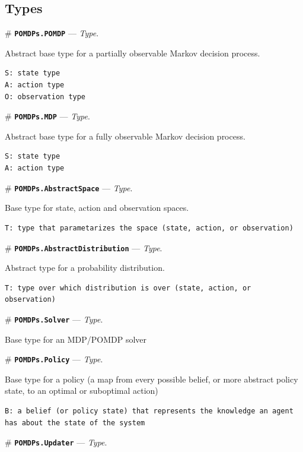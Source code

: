\documentclass[12pt,]{article}
\begin{document}
\subsection{Types}\label{types}

\# \textbf{\texttt{POMDPs.POMDP}} --- \emph{Type}.

Abstract base type for a partially observable Markov decision process.

\begin{verbatim}
S: state type
A: action type
O: observation type
\end{verbatim}

\# \textbf{\texttt{POMDPs.MDP}} --- \emph{Type}.

Abstract base type for a fully observable Markov decision process.

\begin{verbatim}
S: state type
A: action type
\end{verbatim}

\# \textbf{\texttt{POMDPs.AbstractSpace}} --- \emph{Type}.

Base type for state, action and observation spaces.

\begin{verbatim}
T: type that parametarizes the space (state, action, or observation)
\end{verbatim}

\# \textbf{\texttt{POMDPs.AbstractDistribution}} --- \emph{Type}.

Abstract type for a probability distribution.

\begin{verbatim}
T: type over which distribution is over (state, action, or observation)
\end{verbatim}

\# \textbf{\texttt{POMDPs.Solver}} --- \emph{Type}.

Base type for an MDP/POMDP solver

\# \textbf{\texttt{POMDPs.Policy}} --- \emph{Type}.

Base type for a policy (a map from every possible belief, or more
abstract policy state, to an optimal or suboptimal action)

\begin{verbatim}
B: a belief (or policy state) that represents the knowledge an agent has about the state of the system
\end{verbatim}

\# \textbf{\texttt{POMDPs.Updater}} --- \emph{Type}.
\end{document}
